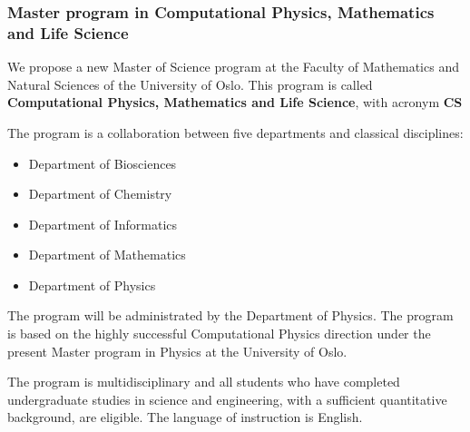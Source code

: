 \documentclass{beamer}
\begin{document}
\begin{frame}
\frametitle{Master program in Computational Physics, Mathematics and Life Science}

\begin{block}{}
We propose a new Master of Science program at the Faculty of Mathematics and Natural Sciences of the University of Oslo. This program is called  \textbf{Computational Physics, Mathematics and Life Science}, with acronym  \textbf{CS}


The program is a collaboration between five departments and classical disciplines:

\begin{itemize}
 \item Department of Biosciences

 \item Department of Chemistry

 \item Department of Informatics

 \item Department of Mathematics

 \item Department of Physics
\end{itemize}

\noindent
The program will be administrated by the Department of Physics.
The program is based on the highly successful Computational Physics direction under the present Master program
in Physics at the University of Oslo.

The program is multidisciplinary and all students who have completed
undergraduate studies in science and engineering, with a sufficient
quantitative background, are eligible.  The language of instruction is
English.



\end{block}
\end{frame}
\end{document}
